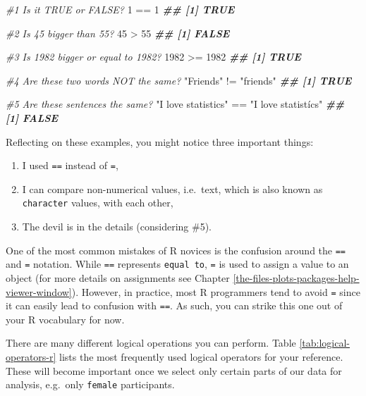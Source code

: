 \documentclass[
]{book}
\newenvironment{Shaded}{\begin{snugshade}}{\end{snugshade}}
\newcommand{\CommentTok}[1]{\textcolor[rgb]{0.56,0.35,0.01}{\textit{#1}}}
\newcommand{\DecValTok}[1]{\textcolor[rgb]{0.00,0.00,0.81}{#1}}
\newcommand{\DocumentationTok}[1]{\textcolor[rgb]{0.56,0.35,0.01}{\textbf{\textit{#1}}}}
\newcommand{\SpecialCharTok}[1]{\textcolor[rgb]{0.00,0.00,0.00}{#1}}
\newcommand{\StringTok}[1]{\textcolor[rgb]{0.31,0.60,0.02}{#1}}
\providecommand{\tightlist}{%
  \setlength{\itemsep}{0pt}\setlength{\parskip}{0pt}}
\begin{document}
\begin{Shaded}
\begin{Highlighting}[]

\CommentTok{\#1 Is it TRUE or FALSE?}
\DecValTok{1} \SpecialCharTok{==} \DecValTok{1}
\DocumentationTok{\#\# [1] TRUE}

\CommentTok{\#2 Is 45 bigger than 55?}
\DecValTok{45} \SpecialCharTok{\textgreater{}} \DecValTok{55}
\DocumentationTok{\#\# [1] FALSE}

\CommentTok{\#3 Is 1982 bigger or equal to 1982?}
\DecValTok{1982} \SpecialCharTok{\textgreater{}=} \DecValTok{1982}
\DocumentationTok{\#\# [1] TRUE}

\CommentTok{\#4 Are these two words NOT the same?}
\StringTok{"Friends"} \SpecialCharTok{!=} \StringTok{"friends"}
\DocumentationTok{\#\# [1] TRUE}

\CommentTok{\#5 Are these sentences the same?}
\StringTok{"I love statistics"} \SpecialCharTok{==} \StringTok{"I love statistícs"}
\DocumentationTok{\#\# [1] FALSE}
\end{Highlighting}
\end{Shaded}

Reflecting on these examples, you might notice three important things:

\begin{enumerate}
\def\labelenumi{\arabic{enumi}.}
\tightlist
\item
  I used \texttt{==} instead of \texttt{=},
\item
  I can compare non-numerical values, i.e.~text, which is also known as \texttt{character} values, with each other,
\item
  The devil is in the details (considering \#5).
\end{enumerate}

One of the most common mistakes of R novices is the confusion around the \texttt{==} and \texttt{=} notation. While \texttt{==} represents \texttt{equal\ to}, \texttt{=} is used to assign a value to an object (for more details on assignments see Chapter \ref{the-files-plots-packages-help-viewer-window}). However, in practice, most R programmers tend to avoid \texttt{=} since it can easily lead to confusion with \texttt{==}. As such, you can strike this one out of your R vocabulary for now.

There are many different logical operations you can perform. Table \ref{tab:logical-operators-r} lists the most frequently used logical operators for your reference. These will become important once we select only certain parts of our data for analysis, e.g.~only \texttt{female} participants.
\end{document}
